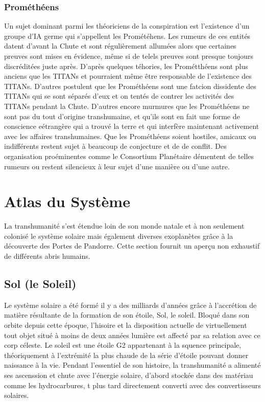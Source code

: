 \subsubsection{Prométhéens} \label{sec:prometheans} 

Un sujet dominant parmi les théoriciens de la conspiration est l'existence d'un groupe d'IA germe qui s'appellent les Prométéhens. Les rumeurs de ces entités datent d'avant la Chute et sont régulièrement allumées alors que certaines preuves sont mises en évidence, même si de telels preuves sont presque toujours discréditées juste après. D'après quelques téhories, les Prométthéens sont plus anciens que les TITANs et pourraient même être responsable de l'existence des TITANs. D'autres postulent que les Prométhéens sont une fatcion dissidente des TITANs qui se sont séparés d'eux et on tentés de contrer les activités des TITANs pendant la Chute. D'autres encore murmures que les Prométhéens ne sont pas du tout d'origine transhumaine, et qu'ils sont en fait une forme de conscience eétrangère qui a trouvé la terre et qui interfère maintenant activement avec les affaires transhumaines. Que les Prométhéens soient hostiles, amicaux ou indifférents restent sujet à beaucoup de conjecture et de de conflit. Des organisation proéminentes comme le Consortium Planétaire démentent de telles rumeurs ou restent silencieux à leur sujet d'une manière ou d'une autre. 

\section{Atlas du Système} \label{sec:system-gazeteer} 

La transhumanité s'est étendue loin de son monde natale et à non seulement colonisé le système solaire mais également diverses exoplanètes grâce à la découverte des Portes de Pandorre. Cette section fournit un aperçu non exhaustif de différents abris humains. 

\subsection{Sol (le Soleil)} \label{sec:sol-the-sun} 

Le système solaire a été formé il y a des milliards d'années grâce à l'accrétion de matière résultante de la formation de son étoile, Sol, le soleil. Bloqué dans son orbite depuis cette époque, l'hisoire et la disposition actuelle de virtuellement tout objet situé à moins de deux années lumière est affecté par sa relation avec ce corp céleste. Le soleil est une étoile G2 appartenant à la squence principale, théoriquement à l'extrémité la plus chaude de la série d'étoile pouvant donner naissance à la vie. Pendant l'essentiel de son histoire, la transhumanité a alimenté ses ascenssion et chute avec l'énergie solaire, d'abord stockée dans des matériau comme les hydrocarbures, t plus tard directement converti avec des convertisseurs solaires. 

